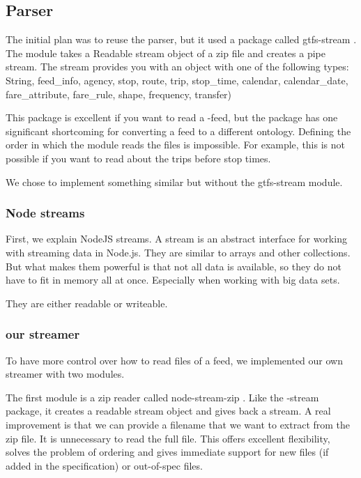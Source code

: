 \subsection{Parser}
The initial plan was to reuse the parser, but it used a package called gtfs-stream \cite{noauthor_staecogtfs-stream_2024}. The module takes a Readable stream object of a  zip file and creates a pipe stream. The stream provides you  with an object with one of the following types: String, feed\_info, agency, stop, route, trip, stop\_time, calendar, calendar\_date, fare\_attribute, fare\_rule, shape, frequency, transfer)

This package is excellent if you want to read a -feed, but the package has one significant shortcoming for converting a feed to a different ontology. Defining the order in which the module reads the files is impossible. For example, this is not possible if you want to read about the trips before stop times.

We chose to implement something similar but without the gtfs-stream module. 
\subsubsection{Node streams}
First, we explain NodeJS streams. A stream is an abstract interface for working with streaming data in Node.js. \cite{noauthor_stream_nodate} They are similar to arrays and other collections. But what makes them powerful is that not all data is available, so they do not have to fit in memory all at once. Especially when working with big data sets.

They are either readable or writeable.

\subsubsection{our  streamer}
To have more control over how to read files of a  feed, we implemented our own  streamer with two modules.



The first module is a zip reader called node-stream-zip \cite{noauthor_node-stream-zip_2021}. Like the -stream package, it creates a readable stream object and gives back a stream. A real improvement is that we can provide a filename that we want to extract from the zip file. It is unnecessary to read the full  file. This offers excellent flexibility, solves the problem of ordering and gives immediate support for new files (if added in the  specification) or out-of-spec files.

